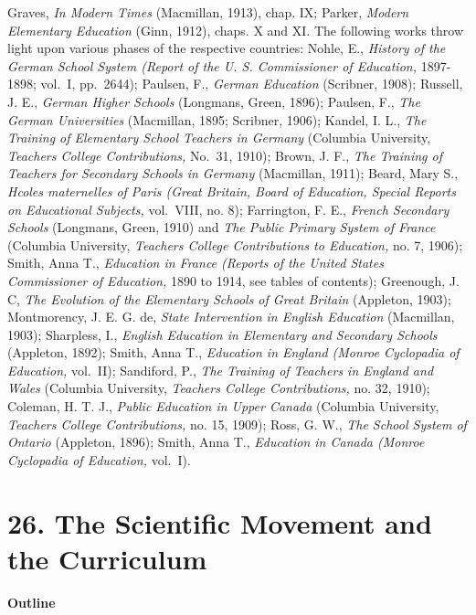 \documentclass[]{book}
\begin{document}
Graves, \emph{In Modern Times} (Macmillan, 1913), chap. IX; Parker, \emph{Modern Elementary Education} (Ginn, 1912), chaps. X and XI. The following works throw light upon various phases of the respective\protect\hypertarget{ch25.xmlux5cux23para.475.1.0.box.288.231.1059.1275.q.50}{}{ countries: Nohle, E., \emph{History of the German School System (Report of the U. S. Commissioner of Education,} 1897-1898; vol.~I, pp.~2644); Paulsen, F., \emph{German Education} (Scribner, 1908); Russell, J. E., \emph{German Higher Schools} (Longmans, Green, 1896); Paulsen, F., \emph{The German Universities} (Macmillan, 1895; Scribner, 1906); Kandel, I. L., \emph{The Training of Elementary School Teachers in Germany} (Columbia University, \emph{Teachers College Contributions,} No.~31, 1910); Brown, J. F., \emph{The Training of Teachers for Secondary Schools in Germany} (Macmillan, 1911); Beard, Mary S., \emph{Hcoles maternelles of Paris (Great Britain, Board of Education, Special Reports on Educational Subjects,} vol.~VIII, no. 8); Farrington, F. E., \emph{French Secondary Schools} (Longmans, Green, 1910) and \emph{The Public Primary System of France} (Columbia University, \emph{Teachers College Contributions to Education,} no. 7, 1906); Smith, Anna T., \emph{Education in France (Reports of the United States Commissioner of Education,} 1890 to 1914, see tables of contents); Greenough, J. C, \emph{The Evolution of the Elementary Schools of Great Britain} (Appleton, 1903); Montmorency, J. E. G. de, \emph{State Intervention in English Education} (Macmillan, 1903); Sharpless, I., \emph{English Education in Elementary and Secondary Schools} (Appleton, 1892); Smith, Anna T., \emph{Education in England (Monroe Cyclopadia of Education,} vol.~II); Sandiford, P., \emph{The Training of Teachers in England and Wales} (Columbia University, \emph{Teachers College Contributions,} no. 32, 1910); Coleman, H. T. J., \emph{Public Education in Upper Canada} (Columbia University, \emph{Teachers College Contributions,} no. 15, 1909); Ross, G. W., \emph{The School System of Ontario} (Appleton, 1896); Smith, Anna T., \emph{Education in Canada (Monroe Cyclopadia of Education,} vol.~I).}

\hypertarget{the-scientific-movement-and-the-curriculum}{%
\chapter{26. The Scientific Movement and the Curriculum}\label{the-scientific-movement-and-the-curriculum}}

\textbf{Outline}
\end{document}
